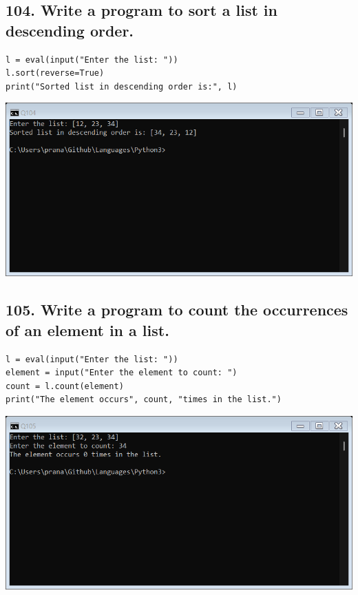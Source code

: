 \documentclass[12pt]{article}
\begin{document}
\subsection*{104. Write a program to sort a list in descending order.}
\begin{verbatim}
l = eval(input("Enter the list: "))
l.sort(reverse=True)
print("Sorted list in descending order is:", l)
\end{verbatim}
\includegraphics[width=\linewidth]{images/104.png}

\subsection*{105. Write a program to count the occurrences of an element in a list.}
\begin{verbatim}
l = eval(input("Enter the list: "))
element = input("Enter the element to count: ")
count = l.count(element)
print("The element occurs", count, "times in the list.")
\end{verbatim}
\includegraphics[width=\linewidth]{images/105.png}
\end{document}
